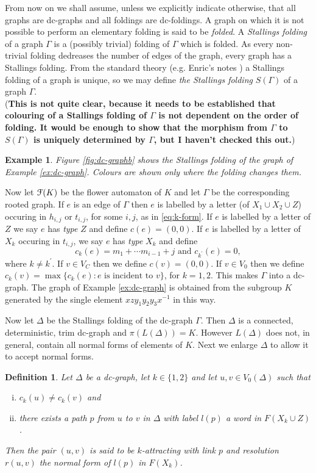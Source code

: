 \documentclass[a4paper,12pt]{article}
\newcommand{\G}{\Gamma }
\newcommand{\D}{\Delta }
\def\cF{{\cal{F}}}
\newtheorem{definition}[theorem]{Definition}
\newtheorem{exam}[theorem]{Example}
\newenvironment{example}{\begin{exam} \rm}{\end{exam}}
\numberwithin{equation}{section}
\numberwithin{figure}{section}
\newcommand{\be}{\begin{enumerate}}
\newcommand{\ee}{\end{enumerate}}
\begin{document}
From now on we shall assume, unless we explicitly indicate otherwise,
 that all graphs are dc-graphs and  all foldings are dc-foldings. 
A graph on which  it is not possible to perform an elementary
folding is 
said to be {\em folded}. A {\em Stallings folding} of a graph $\G$ is
 a (possibly trivial) folding of $\G$ which is folded. As every non-trivial 
folding dedreases
 the number of edges of the graph, every graph has a Stallings folding. From the
standard theory (e.g. Enric's notes \cite{ventura11}) a Stallings folding of a graph is unique,
so we may define {\em the Stallings folding} $S(\G)$ of a graph $\G$.\\
({\bf This is not quite clear, because it needs to be established that colouring
of a Stallings folding of $\G$ is not dependent on  the order of folding. It 
would be enough to show that the morphism from $\G$ to $S(\G)$ is uniquely 
determined by $\G$, but I haven't checked this out.})
\begin{example}
Figure \ref{fig:dc-graphb} shows the Stallings folding of the graph of 
Example \ref{ex:dc-graph}. Colours are shown only where the folding changes them.
\end{example}
%
%
Now let $\cF(K)$ be the flower automaton of $K$ and let 
$\G$ be the corresponding rooted graph. If $e$ is an edge of $\G$ then
$e$ is labelled by a letter (of $X_1\cup X_2 \cup Z$) 
occuring in $h_{i,j}$ or $t_{i,j}$, for some $i,j$, as in 
\eqref{eq:k-form}. If $e$ is labelled by a letter of $Z$ we say $e$ has {\em type} $Z$
and define $c(e)=(0,0)$. If $e$ is labelled by a letter of $X_k$ occuring in 
$t_{i,j}$, we say $e$ has {\em type} $X_k$ and define 
\[c_k(e)=m_1+\cdots m_{i-1} +j\textrm{ and } c_{k^\prime}(e)=0,\]
where $k\neq k^\prime$. If $v\in V_C$ then we define $c(v)=(0,0)$. If $v\in V_0$ then
 we define $c_k(v)=\max\{c_k(e): e \textrm{ is incident to } v\}$, for $k=1,2$.  
This makes $\G$ into a dc-graph. The graph of Example \ref{ex:dc-graph} is obtained 
from the subgroup $K$ generated by the single element $xzy_1y_2y_3x^{-1}$ in this way.

Now let $\D$ be the Stallings folding of the dc-graph $\G$.  Then
 $\D$ is a connected, deterministic, trim dc-graph and $\pi(L(\D))=K$. However
$L(\D)$ does not, in general, contain all normal forms of elements of $K$. 
Next we enlarge $\D$ to allow it to accept normal forms. 
\begin{definition}\label{def:attractive}
Let $\D$ be a  dc-graph, let $k\in \{1,2\}$ and let 
$u,v\in V_0(\D)$ such that 
\be[(i)]
\item $c_k(u)\neq c_k(v)$ and 
\item there exists a path $p$ from $u$ to $v$ in $\D$ with label $l(p)$ 
a word in $F(X_k\cup Z)$. 
\ee
Then the pair $(u,v)$ is said to be 
$k${\em -attracting} with {\em link} $p$ and {\em resolution} 
$r(u,v)$ the normal
form of $l(p)$ in $F(X_k)$. 
\end{definition}
\end{document}
